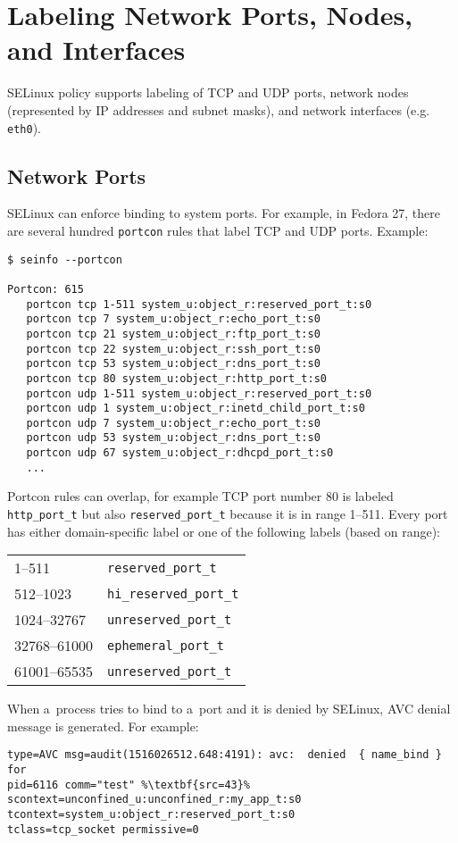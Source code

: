 \section{Labeling Network Ports, Nodes, and Interfaces}
\label{networkobjects}
SELinux policy supports labeling of TCP and UDP ports, network nodes
(represented by IP addresses and subnet masks), and network interfaces (e.g.
\texttt{eth0}).

\subsection{Network Ports}
SELinux can enforce binding to system ports. For example, in Fedora 27, there
are several hundred \texttt{portcon} rules that label TCP and UDP ports.
Example:
\begin{lstlisting}
$ seinfo --portcon

Portcon: 615
   portcon tcp 1-511 system_u:object_r:reserved_port_t:s0
   portcon tcp 7 system_u:object_r:echo_port_t:s0
   portcon tcp 21 system_u:object_r:ftp_port_t:s0
   portcon tcp 22 system_u:object_r:ssh_port_t:s0
   portcon tcp 53 system_u:object_r:dns_port_t:s0
   portcon tcp 80 system_u:object_r:http_port_t:s0
   portcon udp 1-511 system_u:object_r:reserved_port_t:s0
   portcon udp 1 system_u:object_r:inetd_child_port_t:s0
   portcon udp 7 system_u:object_r:echo_port_t:s0
   portcon udp 53 system_u:object_r:dns_port_t:s0
   portcon udp 67 system_u:object_r:dhcpd_port_t:s0
   ...
\end{lstlisting}
Portcon rules can overlap, for example TCP port number 80 is labeled
\texttt{http\_port\_t} but also \texttt{reserved\_port\_t} because it is in range
1--511. Every port has either domain-specific label or one of the following
labels (based on range):

\begin{tabular}{l l}
    1--511 & \texttt{reserved\_port\_t} \\
    512--1023 & \texttt{hi\_reserved\_port\_t} \\
    1024--32767 & \texttt{unreserved\_port\_t} \\
    32768--61000 & \texttt{ephemeral\_port\_t} \\
    61001--65535 & \texttt{unreserved\_port\_t} \\
\end{tabular}

When a~process tries to bind to a~port and it is denied by SELinux, AVC denial
message is generated. For example:
\begin{lstlisting}[escapechar=\%]
type=AVC msg=audit(1516026512.648:4191): avc:  denied  { name_bind } for
pid=6116 comm="test" %\textbf{src=43}% scontext=unconfined_u:unconfined_r:my_app_t:s0
tcontext=system_u:object_r:reserved_port_t:s0
tclass=tcp_socket permissive=0
\end{lstlisting}

